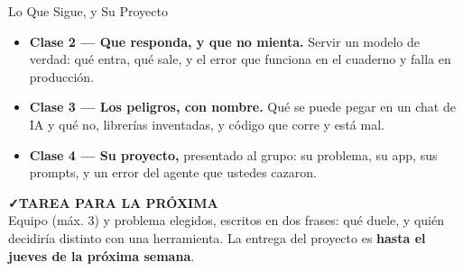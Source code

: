 \documentclass[aspectratio=169, 11pt]{beamer}
\begin{document}
\begin{frame}[shrink=5]{Lo Que Sigue, y Su Proyecto}
  \vspace{2pt}
  {\footnotesize\color{textMuted}
  \begin{itemize}\setlength{\itemsep}{5pt}
    \item[{\color{arcaRed}\faArrowCircleRight}]
      \textbf{Clase 2 --- Que responda, y que no mienta.} Servir un modelo
      de verdad: qué entra, qué sale, y el error que funciona en el cuaderno
      y falla en producción.
    \item[{\color{arcaRed}\faArrowCircleRight}]
      \textbf{Clase 3 --- Los peligros, con nombre.} Qué se puede pegar en
      un chat de IA y qué no, librerías inventadas, y código que corre y
      está mal.
    \item[{\color{arcaRed}\faArrowCircleRight}]
      \textbf{Clase 4 --- Su proyecto,} presentado al grupo: su problema, su
      app, sus prompts, y un error del agente que ustedes cazaron.
  \end{itemize}}
  \vspace{6pt}
  \begin{tcolorbox}[colback=arcaGray, colframe=codeGreen, boxrule=0pt, leftrule=3pt,
    arc=3pt, left=8pt, right=8pt, top=5pt, bottom=5pt]
    {\scriptsize\color{codeGreen}\bfseries\faCheck\hspace{4pt}TAREA PARA LA PRÓXIMA}\\[3pt]
    {\scriptsize\color{textMuted}
     Equipo (máx. 3) y problema elegidos, escritos en dos frases: qué
     duele, y quién decidiría distinto con una herramienta. La entrega del
     proyecto es \textbf{hasta el jueves de la próxima semana}.}
  \end{tcolorbox}
\end{frame}
\end{document}

